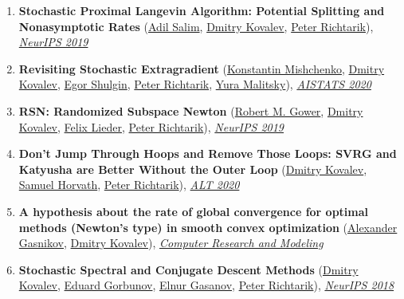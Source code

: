 \begin{enumerate}
\item \textbf{Stochastic Proximal Langevin Algorithm: Potential Splitting and Nonasymptotic Rates} (\href{https://adil-salim.github.io}{\color{linkcolour}Adil Salim}, \href{https://www.dmitry-kovalev.com}{\color{linkcolour}Dmitry Kovalev}, \href{https://richtarik.org}{\color{linkcolour}Peter Richtarik}), \href{https://papers.nips.cc/paper/8891-stochastic-proximal-langevin-algorithm-potential-splitting-and-nonasymptotic-rates}{\em \color{black}NeurIPS 2019}
\item \textbf{Revisiting Stochastic Extragradient} (\href{https://konstmish.github.io}{\color{linkcolour}Konstantin Mishchenko}, \href{https://www.dmitry-kovalev.com}{\color{linkcolour}Dmitry Kovalev}, \href{https://shulgin-egor.github.io}{\color{linkcolour}Egor Shulgin}, \href{https://richtarik.org}{\color{linkcolour}Peter Richtarik}, \href{https://scholar.google.com/citations?user=GI_-KjoAAAAJ}{\color{linkcolour}Yura Malitsky}), \href{http://proceedings.mlr.press/v108/mishchenko20a}{\em \color{black}AISTATS 2020}
\item \textbf{RSN: Randomized Subspace Newton} (\href{https://gowerrobert.github.io}{\color{linkcolour}Robert M. Gower}, \href{https://www.dmitry-kovalev.com}{\color{linkcolour}Dmitry Kovalev}, \href{http://www.opt.uni-duesseldorf.de/~lieder/de/inhalt.php}{\color{linkcolour}Felix Lieder}, \href{https://richtarik.org}{\color{linkcolour}Peter Richtarik}), \href{https://papers.nips.cc/paper/8351-rsn-randomized-subspace-newton}{\em \color{black}NeurIPS 2019}
\item \textbf{Don't Jump Through Hoops and Remove Those Loops: SVRG and Katyusha are Better Without the Outer Loop} (\href{https://www.dmitry-kovalev.com}{\color{linkcolour}Dmitry Kovalev}, \href{https://samuelhorvath.github.io}{\color{linkcolour}Samuel Horvath}, \href{https://richtarik.org}{\color{linkcolour}Peter Richtarik}), \href{http://proceedings.mlr.press/v117/kovalev20a}{\em \color{black}ALT 2020}
\item \textbf{A hypothesis about the rate of global convergence for optimal methods (Newton's type) in smooth convex optimization} (\href{https://scholar.google.ru/citations?user=AmeE8qkAAAAJ}{\color{linkcolour}Alexander Gasnikov}, \href{https://www.dmitry-kovalev.com}{\color{linkcolour}Dmitry Kovalev}), \href{http://crm-en.ics.org.ru/journal/article/2685/}{\em \color{black}Computer Research and Modeling}
\item \textbf{Stochastic Spectral and Conjugate Descent Methods} (\href{https://www.dmitry-kovalev.com}{\color{linkcolour}Dmitry Kovalev}, \href{https://eduardgorbunov.github.io}{\color{linkcolour}Eduard Gorbunov}, \href{https://elnurgasanov.com}{\color{linkcolour}Elnur Gasanov}, \href{https://richtarik.org}{\color{linkcolour}Peter Richtarik}), \href{https://papers.nips.cc/paper/7596-stochastic-spectral-and-conjugate-descent-methods}{\em \color{black}NeurIPS 2018}
\end{enumerate}
